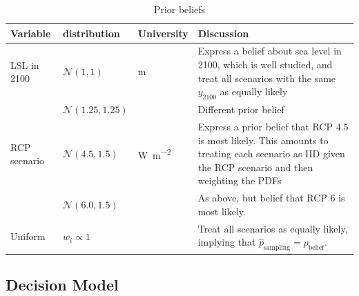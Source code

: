 \documentclass[12pt]{article}
\begin{document}
\begin{table}
    \centering
    \footnotesize
    \begin{tabular}{L{1in}L{0.75in}L{0.5in}L{3.5in}}
        \toprule
        Variable                     &
        distribution                 &
        University                   &
        Discussion                                                                                                                                           \\
        \midrule
        LSL in 2100                  &
        $\mathcal{N}(1, 1)$          &
        \si{m}                       &
        Express a belief about sea level in 2100, which is well studied, and treat all scenarios with the same $\overline{y}_{2100}$ as equally likely       \\
                                     &
        $\mathcal{N}(1.25, 1.25)$    &
                                     &
        Different prior belief                                                                                                                               \\
        RCP scenario                 &
        $\mathcal{N}(4.5, 1.5)$      &
        \si{\watt\per\meter\squared} &
        Express a prior belief that RCP 4.5 is most likely. This amounts to treating each scenario as IID given the RCP scenario and then weighting the PDFs \\
                                     &
        $\mathcal{N}(6.0, 1.5)$      &
                                     &
        As above, but belief that RCP 6 is most likely.                                                                                                      \\
        Uniform                      &
        $w_i \propto 1$              &
                                     &
        Treat all scenarios as equally likely, implying that $\hat{p}_\text{sampling} = p_\text{belief}$.                                                    \\
        \bottomrule
    \end{tabular}
    \caption{Prior beliefs}
\end{table}

\subsection{Decision Model}\label{sec:methods-decision}
\end{document}
